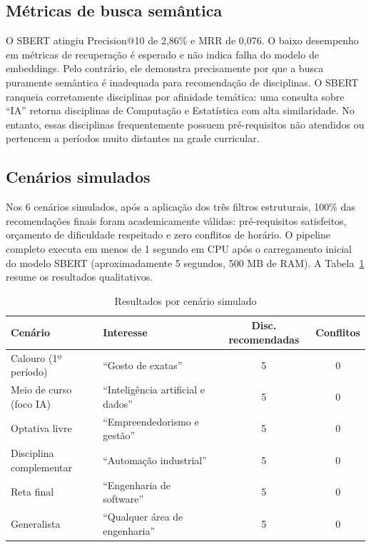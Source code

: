 \documentclass[12pt,a4paper]{article}
\begin{document}
\subsection{Métricas de busca semântica}

O SBERT atingiu Precision@10 de 2,86\% e MRR de 0,076. O baixo desempenho em métricas de recuperação é esperado e não indica falha do modelo de embeddings. Pelo contrário, ele demonstra precisamente por que a busca puramente semântica é inadequada para recomendação de disciplinas. O SBERT ranqueia corretamente disciplinas por afinidade temática: uma consulta sobre ``IA'' retorna disciplinas de Computação e Estatística com alta similaridade. No entanto, essas disciplinas frequentemente possuem pré-requisitos não atendidos ou pertencem a períodos muito distantes na grade curricular.

\subsection{Cenários simulados}

Nos 6 cenários simulados, após a aplicação dos três filtros estruturais, 100\% das recomendações finais foram academicamente válidas: pré-requisitos satisfeitos, orçamento de dificuldade respeitado e zero conflitos de horário. O pipeline completo executa em menos de 1 segundo em CPU após o carregamento inicial do modelo SBERT (aproximadamente 5 segundos, 500 MB de RAM). A Tabela~\ref{tab:cenarios} resume os resultados qualitativos.

\begin{table}[H]
\centering
\caption{Resultados por cenário simulado}
\label{tab:cenarios}
\begin{tabular}{lp{5cm}cc}
\toprule
\textbf{Cenário} & \textbf{Interesse} & \textbf{Disc. recomendadas} & \textbf{Conflitos} \\
\midrule
Calouro (1º período)     & ``Gosto de exatas''                  & 5 & 0 \\
Meio de curso (foco IA)  & ``Inteligência artificial e dados'' & 5 & 0 \\
Optativa livre           & ``Empreendedorismo e gestão''        & 5 & 0 \\
Disciplina complementar  & ``Automação industrial''             & 5 & 0 \\
Reta final               & ``Engenharia de software''           & 5 & 0 \\
Generalista              & ``Qualquer área de engenharia''      & 5 & 0 \\
\bottomrule
\end{tabular}
\end{table}
\end{document}
